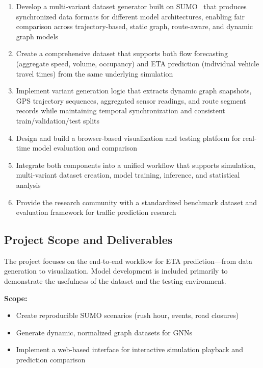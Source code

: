 \begin{enumerate}
    \item Develop a multi-variant dataset generator built on SUMO~\cite{SUMO2018} that produces synchronized data formats for different model architectures, enabling fair comparison across trajectory-based, static graph, route-aware, and dynamic graph models
    \item Create a comprehensive dataset that supports both flow forecasting (aggregate speed, volume, occupancy) and ETA prediction (individual vehicle travel times) from the same underlying simulation
    \item Implement variant generation logic that extracts dynamic graph snapshots, GPS trajectory sequences, aggregated sensor readings, and route segment records while maintaining temporal synchronization and consistent train/validation/test splits
    \item Design and build a browser-based visualization and testing platform for real-time model evaluation and comparison
    \item Integrate both components into a unified workflow that supports simulation, multi-variant dataset creation, model training, inference, and statistical analysis
    \item Provide the research community with a standardized benchmark dataset and evaluation framework for traffic prediction research
\end{enumerate}

\subsection{Project Scope and Deliverables}

The project focuses on the end-to-end workflow for ETA prediction—from data generation to visualization. Model development is included primarily to demonstrate the usefulness of the dataset and the testing environment.

\textbf{Scope:}

\begin{itemize}
    \item Create reproducible SUMO scenarios (rush hour, events, road closures)
    \item Generate dynamic, normalized graph datasets for GNNs
    \item Implement a web-based interface for interactive simulation playback and prediction comparison
\end{itemize}

